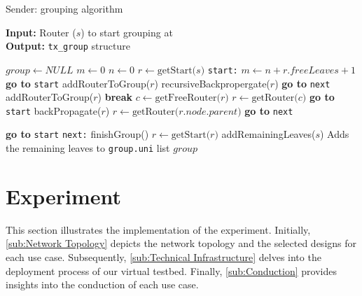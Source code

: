 \begin{algorithm}
    \caption{Sender: grouping algorithm}\label{alg:sender_grouping}
    \hspace*{\algorithmicindent} \textbf{Input:} Router ($s$) to start grouping at\\
    \hspace*{\algorithmicindent} \textbf{Output:} \texttt{tx\_group} structure\\
\begin{algorithmic}[1]
\State $group\gets NULL$
\State $m\gets 0$
\State $n\gets 0$
\State $r\gets \text{getStart($s$)}$
\Label \texttt{start:}
        \State $m\gets n + r.freeLeaves + 1$
            \State \textbf{go to} \texttt{start}
            \State addRouterToGroup($r$)
            \State recursiveBackpropergate($r$)
            \State \textbf{go to} \texttt{next}
            \State addRouterToGroup($r$)
            \State \textbf{break}
        \EndIf
    \EndWhile
        \State $c\gets \text{getFreeRouter($r$)}$
            \State $r\gets \text{getRouter($c$)}$
            \State \textbf{go to} \texttt{start}
        \EndIf
    \EndWhile
        \State backPropagate($r$)
        \State $r\gets \text{getRouter($r.node.parent$)}$
            \State \textbf{go to} \texttt{next}
        \EndIf

        \State \textbf{go to} \texttt{start}
    \EndIf
\Label \texttt{next:}
    \State finishGroup()
    \State $r\gets \text{getStart($r$)}$
\EndWhile
    \State addRemainingLeaves($s$)
    \Comment Adds the remaining leaves to \texttt{group.uni} list 
    \State \Return $group$
\end{algorithmic}
\end{algorithm}


\section{Experiment} %
\label{sec:Experiment}
This section illustrates the implementation of the experiment.
Initially, \autoref{sub:Network Topology} depicts the network topology and
    the selected designs for each use case.
Subsequently, \autoref{sub:Technical Infrastructure} delves into the deployment
    process of our virtual testbed.
Finally, \autoref{sub:Conduction} provides insights into the conduction
    of each use case.

